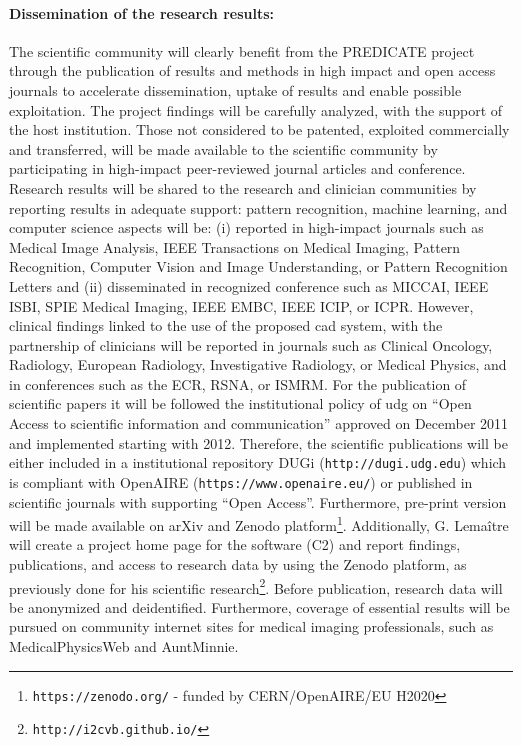 \paragraph{Dissemination of the research results:}
The scientific community will clearly benefit from the PREDICATE project through the publication of results and methods in high impact and open access journals to accelerate dissemination, uptake of results and enable possible exploitation.
The project findings will be carefully analyzed, with the support of the host institution. Those not considered to be patented, exploited commercially and transferred, will be made available to the scientific community by participating in high-impact peer-reviewed journal articles and conference.
Research results will be shared to the research and clinician communities by reporting results in adequate support: pattern recognition, machine learning, and computer science aspects will be: (i) reported in high-impact journals such as Medical Image Analysis, IEEE Transactions on Medical Imaging, Pattern Recognition, Computer Vision and Image Understanding, or Pattern Recognition Letters and (ii) disseminated in recognized conference such as MICCAI, IEEE ISBI, SPIE Medical Imaging, IEEE EMBC, IEEE ICIP, or ICPR.
However, clinical findings linked to the use of the proposed \ac{cad} system, with the partnership of clinicians will be reported in journals such as Clinical Oncology, Radiology, European Radiology, Investigative Radiology, or Medical Physics, and in conferences such as the ECR, RSNA, or ISMRM.
For the publication of scientific papers it will be followed the institutional policy of \ac{udg} on ``Open Access to scientific information and communication'' approved on December 2011 and implemented starting with 2012.
Therefore, the scientific publications will be either included in a institutional repository DUGi (\texttt{http://dugi.udg.edu}) which is compliant with OpenAIRE (\texttt{https://www.openaire.eu/}) or published in scientific journals with supporting ``Open Access''.
Furthermore, pre-print version will be made available on arXiv and Zenodo platform\footnote{\texttt{https://zenodo.org/} - funded by CERN/OpenAIRE/EU H2020}.
Additionally, G. Lema\^itre  will create a project home page for the software (C2) and report findings, publications, and access to research data by using the Zenodo platform, as previously done for his scientific research\footnote{\texttt{http://i2cvb.github.io/}}.
Before publication, research data will be anonymized and deidentified.
Furthermore, coverage of essential results will be pursued on community internet sites for medical imaging professionals, such as MedicalPhysicsWeb and AuntMinnie.

